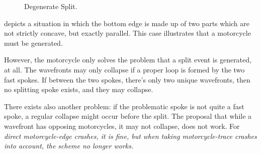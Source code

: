 \documentclass[12pt,a4paper,oneside,openany]{article}
\begin{document}
\begin{figure}[htpb]
\begin{center}
\caption{Degenerate Split.}
\label{fig:parallelnonsplit}
\end{center}
\end{figure}


 depicts a situation in which the bottom edge is made up of two parts which are not strictly concave, but exactly parallel. This case illustrates that a motorcycle must be generated.

However, the motorcycle only solves the problem that a split event is generated, at all. The wavefronts may only collapse if a proper loop is formed by the two fast spokes. If between the two spokes, there's only two unique wavefronts, then no splitting spoke exists, and they may collapse.

There exists also another problem: if the problematic spoke is not quite a fast spoke, a regular collapse might occur before the split. The proposal that while a wavefront has opposing motorcycles, it may not collapse, does not work. For \em direct \em motorcycle-edge crashes, it is fine, but when taking motorcycle-trace crashes into account, the scheme no longer works.
\end{document}

